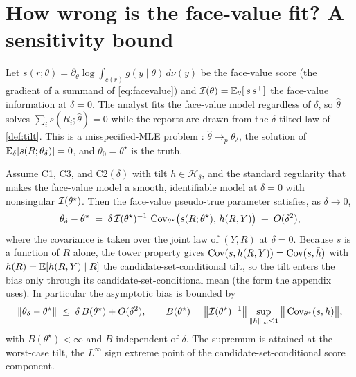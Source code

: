 \section{How wrong is the face-value fit? A sensitivity bound}
\label{sec:sensitivity}

Let $s(r; \theta) = \partial_\theta \log \int_{c(r)} g(y \mid \theta)\, d\nu(y)$ be
the face-value score (the gradient of a summand of \eqref{eq:facevalue}) and
$\mathcal{I}(\theta) = \mathbb{E}_\theta[\, s\, s^\top]$ the face-value information at $\delta =
0$. The analyst fits the face-value model regardless of $\delta$, so $\hat\theta$
solves $\sum_i s(R_i; \hat\theta) = 0$ while the reports are drawn from the
$\delta$-tilted law of \cref{def:tilt}. This is a misspecified-MLE problem
\citep{huber1967behavior,white1982maximum}: $\hat\theta \to_p \theta_\delta$, the
solution of $\mathbb{E}_\delta[s(R; \theta_\delta)] = 0$, and $\theta_0 = \theta^\star$ is
the truth.

\begin{theorem}
\label{thm:sensitivity}
Assume C1, C3, and $\mathrm{C2}(\delta)$ with tilt $h \in \mathcal{H}_\delta$, and
the standard regularity that makes the face-value model a smooth, identifiable
model at $\delta = 0$ with nonsingular $\mathcal{I}(\theta^\star)$. Then the face-value
pseudo-true parameter satisfies, as $\delta \to 0$,
\begin{equation}
  \theta_\delta - \theta^\star
  \;=\; \delta\, \mathcal{I}(\theta^\star)^{-1}\,
        \operatorname{Cov}_{\theta^\star}\!\big(s(R; \theta^\star),\, h(R, Y)\big)
  \;+\; O(\delta^2),
  \label{eq:bias}
\end{equation}
where the covariance is taken over the joint law of $(Y, R)$ at $\delta = 0$. Because
$s$ is a function of $R$ alone, the tower property gives $\operatorname{Cov}(s, h(R,Y)) = \operatorname{Cov}(s,
\bar h)$ with $\bar h(R) = \mathbb{E}[h(R,Y) \mid R]$ the candidate-set-conditional tilt, so
the tilt enters the bias only through its candidate-set-conditional mean (the form
the appendix uses). In particular the asymptotic bias is bounded by
\begin{equation}
  \|\theta_\delta - \theta^\star\|
  \;\le\; \delta\, B(\theta^\star) + O(\delta^2),
  \qquad
  B(\theta^\star) = \big\|\mathcal{I}(\theta^\star)^{-1}\big\|
     \sup_{\|h\|_\infty \le 1}
       \big\|\operatorname{Cov}_{\theta^\star}(s, h)\big\|,
  \label{eq:Bdelta}
\end{equation}
with $B(\theta^\star) < \infty$ and $B$ independent of $\delta$. The supremum is
attained at the worst-case tilt, the $L^\infty$ sign extreme point of the
candidate-set-conditional score component.
\end{theorem}

